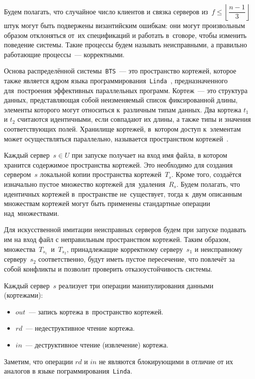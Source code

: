 Будем полагать, что случайное число клиентов и связка серверов из~$f \leqslant \left\lfloor \dfrac{n-1}{3} \right\rfloor$ штук могут быть подвержены византийским ошибкам: они могут произвольным образом отклоняться от~их спецификаций и работать в~сговоре, чтобы изменить поведение системы. Такие процессы будем называть неисправными, а правильно работающие процессы~--- корректными.

Основа распределённой системы~\texttt{BTS}~--- это пространство кортежей, которое также является ядром языка программирования~\texttt{Linda}~\autocite{linda}, предназначенного для~построения эффективных параллельных программ. Кортеж~--- это структура данных, представляющая собой неизменяемый список фиксированной длины, элементы которого могут относиться к~различным типам данных. Два кортежа $t_1$ и $t_2$ считаются идентичными, если совпадают их длины, а также типы и значения соответствующих полей. Хранилище кортежей, в~котором доступ к~элементам может осуществляться параллельно, называется пространством кортежей~\autocite{tuplespace}.

Каждый сервер~$s \in U$ при запуске получает на вход имя файла, в котором хранится содержимое пространства кортежей. Это необходимо для создания сервером~$s$ локальной копии пространства кортежей~$T_s$. Кроме того, создаётся изначально пустое множество кортежей для~удаления~$R_s$. Будем полагать, что идентичных кортежей в~пространстве не~существует, тогда к~двум описанным множествам кортежей могут быть применены стандартные операции над~множествами.

Для искусственной имитации неисправных серверов будем при запуске подавать им на вход файл с неправильным пространством кортежей. Таким образом, множества~$T_{s_1}$~и~$T_{s_2}$, принадлежащие корректному серверу~$s_1$ и неисправному серверу~$s_2$ соответственно, будут иметь пустое пересечение, что повлечёт за собой конфликты и позволит проверить отказоустойчивость системы.

Каждый сервер~$s$ реализует три операции манипулирования данными (кортежами):
\begin{itemize}
	\item $out$~--- запись кортежа в~пространство кортежей.
	\item $rd$~--- недеструктивное чтение кортежа.
	\item $in$~--- деструктивное чтение (извлечение) кортежа.
\end{itemize}
Заметим, что операции $rd$ и $in$ не являются блокирующими в отличие от их аналогов в языке пограммирования~\texttt{Linda}.

